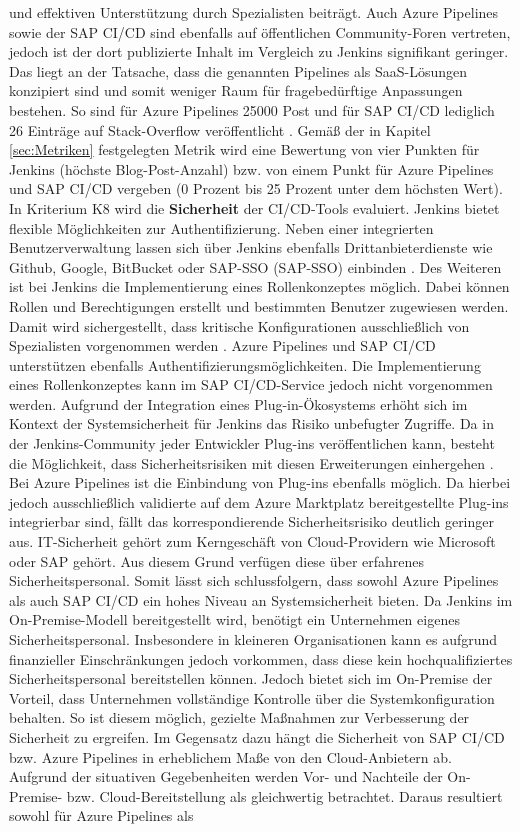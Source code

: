 und effektiven Unterstützung durch Spezialisten beiträgt. Auch Azure Pipelines sowie der SAP CI/CD sind ebenfalls auf öffentlichen Community-Foren vertreten, jedoch ist der dort publizierte Inhalt im Vergleich zu Jenkins signifikant geringer. Das liegt an der Tatsache, dass die genannten Pipelines als SaaS-Lösungen konzipiert sind und somit weniger Raum für fragebedürftige Anpassungen bestehen. So sind für Azure Pipelines 25000 Post und für SAP CI/CD lediglich 26 Einträge auf Stack-Overflow veröffentlicht \cite{StackOverflow.20230403b}\cite{StackOverflow.20230403c}. Gemäß der in Kapitel \ref{sec:Metriken} festgelegten Metrik wird eine Bewertung von vier Punkten für Jenkins (höchste Blog-Post-Anzahl) bzw. von einem Punkt für Azure Pipelines und SAP CI/CD vergeben (0 Prozent bis 25 Prozent unter dem höchsten Wert). In Kriterium K8 wird die \textbf{Sicherheit} der CI/CD-Tools evaluiert. Jenkins bietet flexible Möglichkeiten zur Authentifizierung. Neben einer integrierten Benutzerverwaltung lassen sich über Jenkins ebenfalls Drittanbieterdienste wie Github, Google, BitBucket oder SAP-\acl{SSO} (SAP-\acs{SSO}) einbinden \cite{.20230410f}. Des Weiteren ist bei Jenkins die Implementierung eines Rollenkonzeptes möglich. Dabei können Rollen und Berechtigungen erstellt und bestimmten Benutzer zugewiesen werden. Damit wird sichergestellt, dass kritische Konfigurationen ausschließlich von Spezialisten vorgenommen werden \cite{.20230410g}. Azure Pipelines und SAP CI/CD unterstützen ebenfalls Authentifizierungsmöglichkeiten. Die Implementierung eines Rollenkonzeptes kann im SAP CI/CD-Service jedoch nicht vorgenommen werden. Aufgrund der Integration eines Plug-in-Ökosystems erhöht sich im Kontext der Systemsicherheit für Jenkins das Risiko unbefugter Zugriffe. Da in der Jenkins-Community jeder Entwickler Plug-ins veröffentlichen kann, besteht die Möglichkeit, dass Sicherheitsrisiken mit diesen Erweiterungen einhergehen \cite[Z. 39]{SoftwareArchitektSAPDTSIntegration.}. Bei Azure Pipelines ist die Einbindung von Plug-ins ebenfalls möglich. Da hierbei jedoch ausschließlich validierte auf dem Azure Marktplatz bereitgestellte Plug-ins integrierbar sind, fällt das korrespondierende Sicherheitsrisiko deutlich geringer aus. IT-Sicherheit gehört zum Kerngeschäft von Cloud-Providern wie Microsoft oder SAP gehört. Aus diesem Grund verfügen diese über erfahrenes Sicherheitspersonal. Somit lässt sich schlussfolgern, dass sowohl Azure Pipelines als auch SAP CI/CD ein hohes Niveau an Systemsicherheit bieten. Da Jenkins im On-Premise-Modell bereitgestellt wird, benötigt ein Unternehmen eigenes Sicherheitspersonal. Insbesondere in kleineren Organisationen kann es aufgrund finanzieller Einschränkungen jedoch vorkommen, dass diese kein hochqualifiziertes Sicherheitspersonal bereitstellen können. Jedoch bietet sich im On-Premise der Vorteil, dass Unternehmen vollständige Kontrolle über die Systemkonfiguration behalten. So ist diesem möglich, gezielte Maßnahmen zur Verbesserung der Sicherheit zu ergreifen. Im Gegensatz dazu hängt die Sicherheit von SAP CI/CD bzw. Azure Pipelines in erheblichem Maße von den Cloud-Anbietern ab. Aufgrund der situativen Gegebenheiten werden Vor- und Nachteile der On-Premise- bzw. Cloud-Bereitstellung als gleichwertig betrachtet. Daraus resultiert sowohl für Azure Pipelines als 